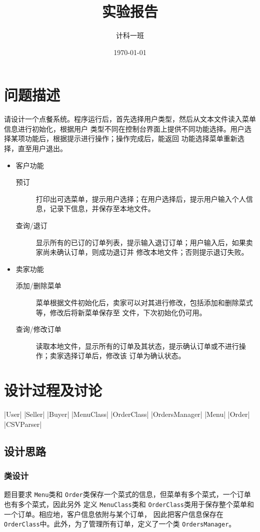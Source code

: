 \documentclass[adobefonts,a4paper]{ctexart}
\title{实验报告}
\author{计科一班\quad蔡日骏\quad12348003}
\date{\today}
\begin{document}
\maketitle

\section{问题描述}
请设计一个点餐系统。程序运行后，首先选择用户类型，然后从文本文件读入菜单信息进行初始化，根据用户
类型不同在控制台界面上提供不同功能选择。用户选择某项功能后，根据提示进行操作；操作完成后，能返回
功能选择菜单重新选择，直至用户退出。
\begin{itemize}
 \item 客户功能
 \begin{description}
  \item[预订] 打印出可选菜单，提示用户选择；在用户选择后，提示用户输入个人信息，记录下信息，并保存至本地文件。
  \item[查询/退订] 显示所有的已订的订单列表，提示输入退订订单；用户输入后，如果卖家尚未确认订单，则成功退订并
  修改本地文件；否则提示退订失败。
 \end{description}

 \item 卖家功能
 \begin{description}
  \item[添加/删除菜单]菜单根据文件初始化后，卖家可以对其进行修改，包括添加和删除菜式等，修改后将新菜单保存至
  文件，下次初始化仍可用。
  \item[查询/修改订单] 读取本地文件，显示所有的订单及其状态，提示确认订单或不进行操作；卖家选择订单后，修改该
  订单为确认状态。
 \end{description}
\end{itemize}


\section{设计过程及讨论}

 |User|
 |Seller|
 |Buyer|
 |MenuClass|
 |OrderClass|
 |OrdersManager|
 |Menu|
 |Order|
 |CSVParser|
 
\subsection{设计思路}
\subsubsection{类设计}
题目要求 \verb|Menu|类和 \verb|Order|类保存一个菜式的信息，但菜单有多个菜式，一个订单也有多个菜式，因此另外
定义 \verb|MenuClass|类和 \verb|OrderClass|类用于保存整个菜单和一个订单。相应地，客户信息依附与某个订单，
因此把客户信息保存在 \verb|OrderClass|中。此外，为了管理所有订单，定义了一个类 \verb|OrdersManager|。
\end{document}

